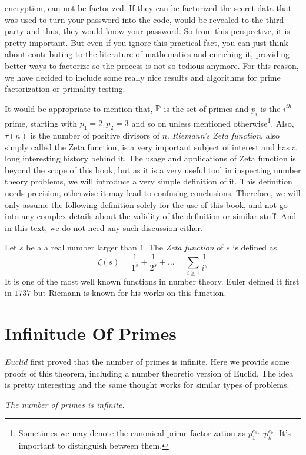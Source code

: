 \documentclass{subfiles}
\begin{document}
encryption, can not be factorized. If they can be factorized the secret data that was used to turn your password into the code, would be revealed to the third party and thus, they would know your password. So from this perspective, it is pretty important. But even if you ignore this practical fact, you can just think about contributing to the literature of mathematics and enriching it, providing better ways to factorize so the process is not so tedious anymore. For this reason, we have decided to include some really nice results and algorithms for prime factorization or primality testing.
	
	It would be appropriate to mention that, $\P $ is the set of primes and $p_i$ is the $i^{th}$ prime, starting with $p_1=2,p_2=3$ and so on unless mentioned otherwise\footnote{Sometimes we may denote the canonical prime factorization as $p_1^{e_1}\cdots p_k^{e_k}$. It's important to distinguish between them.}. Also, $\tau(n)$ is the number of positive divisors of $n$. \textit{Riemann's Zeta function}, also simply called the Zeta function, is a very important subject of interest and has a long interesting history behind it. The usage and applications of Zeta function is beyond the scope of this book, but as it is a very useful tool in inspecting number theory problems, we will introduce a very simple definition of it. This definition needs precision, otherwise it may lead to confusing conclusions. Therefore, we will only assume the following definition solely for the use of this book, and not go into any complex details about the validity of the definition or similar stuff. And in this text, we do not need any such discussion either.
	\begin{definition}
		Let $s$ be a a real number larger than $1$. The \textit{Zeta function} of $s$ is defined as
		\[\zeta(s)=\dfrac{1}{1^s}+\dfrac{1}{2^s}+\ldots=\sum_{i\geq1}\dfrac{1}{i^s}\]
		It is one of the most well known functions in number theory. Euler defined it first in $1737$ but Riemann is known for his works on this function.
	\end{definition}
	\section{Infinitude Of Primes}
	\label{sec:infiniteprimes}
	\textit{Euclid} first proved that the number of primes is infinite. Here we provide some proofs of this theorem, including a number theoretic version of Euclid. The idea is pretty interesting and the same thought works for similar types of problems.
	\begin{theorem}\sl
		The number of primes is infinite.
	\end{theorem}
	
\end{document}
